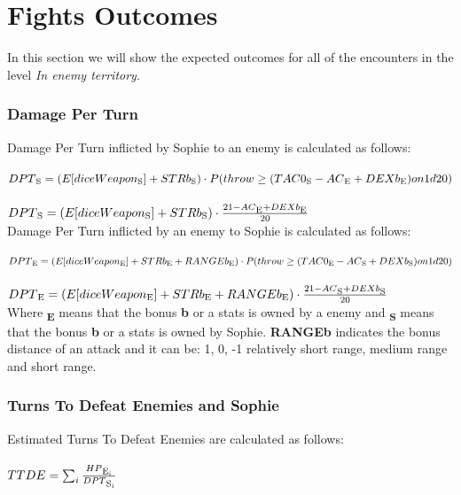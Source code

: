 \section{Fights Outcomes}
In this section we will show the expected outcomes for all of the encounters in the level \textit{In enemy territory}. 

\subsubsection{Damage Per Turn}
Damage Per Turn inflicted by Sophie to an enemy is calculated as follows: \\\\
$DPT\textsubscript{S}=(E[diceWeapon\textsubscript{S}] + STRb\textsubscript{S}) \cdot P(throw \ge (TAC0\textsubscript{S} - AC\textsubscript{E} + DEXb\textsubscript{E}) on 1d20)$ \\\\
$DPT\textsubscript{S}=(E[diceWeapon\textsubscript{S}] + STRb\textsubscript{S}) \cdot \frac{21-AC\textsubscript{E} + DEXb\textsubscript{E}}{20}$ \\

Damage Per Turn inflicted by an enemy to Sophie is calculated as follows: \\\\
$DPT\textsubscript{E}=(E[diceWeapon\textsubscript{E}] + STRb\textsubscript{E} + RANGEb\textsubscript{E}) \cdot P(throw \ge (TAC0\textsubscript{E} - AC\textsubscript{S} + DEXb\textsubscript{S}) on 1d20)$ \\\\
$DPT\textsubscript{E}=(E[diceWeapon\textsubscript{E}] + STRb\textsubscript{E} + RANGEb\textsubscript{E}) \cdot \frac{21-AC\textsubscript{S} + DEXb\textsubscript{S}}{20}$ \\

Where \textbf{\textsubscript{E}} means that the bonus \textbf{b} or a stats is owned by a enemy and \textbf{\textsubscript{S}} means that the bonus \textbf{b} or a stats is owned by Sophie. \textbf{RANGEb} indicates the bonus distance of an attack and it can be: 1, 0, -1 relatively short range, medium range and short range.

\subsubsection{Turns To Defeat Enemies and Sophie}
Estimated Turns To Defeat Enemies are calculated as follows: \\\\
$TTDE=\sum_{i}\frac{HP\textsubscript{E\textsubscript{i}}}{DPT\textsubscript{S\textsubscript{i}}}$ \\

